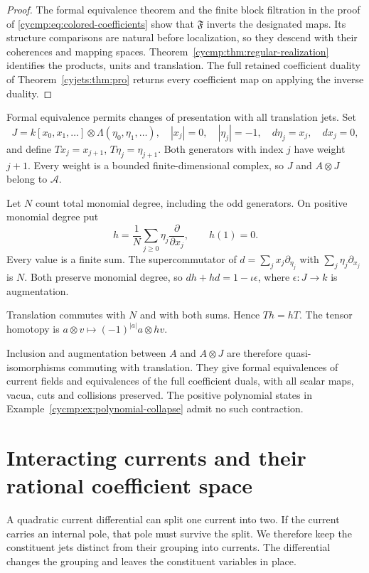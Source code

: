 \begin{proof}
The formal equivalence theorem and the finite block filtration in
the proof of \eqref{cycmp:eq:colored-coefficients} show that
$\mathfrak F$ inverts the designated maps. Its structure comparisons
are natural before localization, so they descend with their
coherences and mapping spaces. Theorem~\ref{cycmp:thm:regular-realization}
identifies the products, units and translation.
The full retained coefficient duality of
Theorem~\ref{cyjets:thm:pro} returns every coefficient map on applying
the inverse duality.
\end{proof}

\begin{example}\label{cycmp:ex:contractible-jets}
Formal equivalence permits changes of presentation with all
translation jets. Set
\[
 J=k[x_0,x_1,\ldots]\otimes\Lambda(\eta_0,\eta_1,\ldots),
 \quad |x_j|=0,\quad |\eta_j|=-1,
 \quad d\eta_j=x_j,\quad dx_j=0,
\]
and define $Tx_j=x_{j+1}$, $T\eta_j=\eta_{j+1}$.
Both generators with index $j$ have weight $j+1$.
Every weight is a bounded finite-dimensional complex, so $J$ and
$A\otimes J$ belong to $\mathcal A$.

Let $N$ count total monomial degree, including the odd generators.
On positive monomial degree put
\[
 h=\frac1N\sum_{j\ge0}\eta_j\frac{\partial}{\partial x_j},
 \qquad h(1)=0.
\]
Every value is a finite sum. The supercommutator of
$d=\sum_jx_j\partial_{\eta_j}$ with
$\sum_j\eta_j\partial_{x_j}$ is $N$. Both preserve monomial degree,
so $dh+hd=1-\iota\epsilon$, where $\epsilon:J\to k$ is augmentation.

Translation commutes with $N$ and with both sums. Hence $Th=hT$.
The tensor homotopy is
$a\otimes v\mapsto(-1)^{|a|}a\otimes hv$.

Inclusion and augmentation between $A$ and $A\otimes J$ are therefore
quasi-isomorphisms commuting with translation. They give formal
equivalences of current fields and equivalences of the full
coefficient duals, with all scalar maps, vacua, cuts and collisions
preserved. The positive polynomial states in
Example~\ref{cycmp:ex:polynomial-collapse} admit no such contraction.
\end{example}

\section{Interacting currents and their rational coefficient space}
\label{cycmp:sec:interacting}

A quadratic current differential can split one current into two.
If the current carries an internal pole, that pole must survive the
split. We therefore keep the constituent jets distinct from their
grouping into currents. The differential changes the grouping and
leaves the constituent variables in place.

